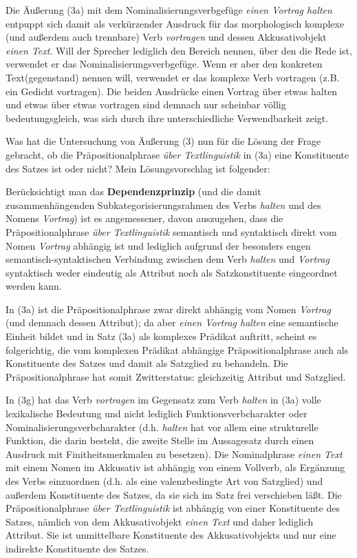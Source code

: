 \documentclass[
  letterpaper,
  DIV=11,
  numbers=noendperiod]{scrreprt}
\begin{document}
Die Äußerung (3a) mit dem Nominalisierungsverbgefüge \emph{einen Vortrag
halten} entpuppt sich damit als verkürzender Ausdruck für das
morphologisch komplexe (und außerdem auch trennbare) Verb
\emph{vortragen} und dessen Akkusativobjekt \emph{einen Text}. Will der
Sprecher lediglich den Bereich nennen, über den die Rede ist, verwendet
er das Nominalisierungsverbgefüge. Wenn er aber den konkreten
Text(gegenstand) nennen will, verwendet er das komplexe Verb vortragen
(z.B. ein Gedicht vortragen). Die beiden Ausdrücke einen Vortrag über
etwas halten und etwas über etwas vortragen sind demnach nur scheinbar
völlig bedeutungsgleich, was sich durch ihre unterschiedliche
Verwendbarkeit zeigt.

Was hat die Untersuchung von Äußerung (3) nun für die Lösung der Frage
gebracht, ob die Präpositionalphrase \emph{über Textlinguistik} in (3a)
eine Konstituente des Satzes ist oder nicht? Mein Lösungsvorschlag ist
folgender:

Berücksichtigt man das \textbf{Dependenzprinzip} (und die damit
zusammenhängenden Subkategorisierungsrahmen des Verbs \emph{halten} und
des Nomens \emph{Vortrag}) ist es angemessener, davon auszugehen, dass
die Präpositionalphrase \emph{über Textlinguistik} semantisch und
syntaktisch direkt vom Nomen \emph{Vortrag} abhängig ist und lediglich
aufgrund der besonders engen semantisch-syntaktischen Verbindung
zwischen dem Verb \emph{halten} und \emph{Vortrag} syntaktisch weder
eindeutig als Attribut noch als Satzkonstituente eingeordnet werden
kann.

In (3a) ist die Präpositionalphrase zwar direkt abhängig vom Nomen
\emph{Vortrag} (und demnach dessen Attribut); da aber \emph{einen
Vortrag halten} eine semantische Einheit bildet und in Satz (3a) als
komplexes Prädikat auftritt, scheint es folgerichtig, die vom komplexen
Prädikat abhängige Präpositionalphrase auch als Konstituente des Satzes
und damit als Satzglied zu behandeln. Die Präpositionalphrase hat somit
Zwitterstatus: gleichzeitig Attribut und Satzglied.

In (3g) hat das Verb \emph{vortragen} im Gegensatz zum Verb
\emph{halten} in (3a) volle lexikalische Bedeutung und nicht lediglich
Funktionsverbcharakter oder Nominalisierungsverbcharakter (d.h.
\emph{halten} hat vor allem eine strukturelle Funktion, die darin
besteht, die zweite Stelle im Aussagesatz durch einen Ausdruck mit
Finitheitsmerkmalen zu besetzen). Die Nominalphrase \emph{einen Text}
mit einem Nomen im Akkusativ ist abhängig von einem Vollverb, als
Ergänzung des Verbs einzuordnen (d.h. als eine valenzbedingte Art von
Satzglied) und außerdem Konstituente des Satzes, da sie sich im Satz
frei verschieben läßt. Die Präpositionalphrase \emph{über
Textlinguistik} ist abhängig von einer Konstituente des Satzes, nämlich
von dem Akkusativobjekt \emph{einen Text} und daher lediglich Attribut.
Sie ist unmittelbare Konstituente des Akkusativobjekts und nur eine
indirekte Konstituente des Satzes.
\end{document}
